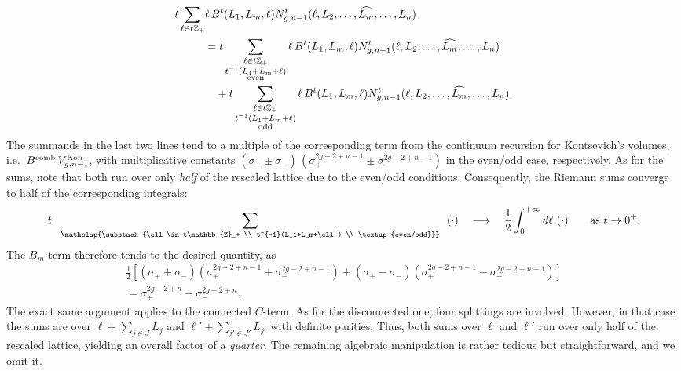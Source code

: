 \documentclass[a4paper,11pt,english]{article}
\theoremstyle{plain}
\theoremstyle{definition}
\theoremstyle{plain}
\newcommand{\Z}{\mathbb{Z}}
\begin{document}
\begin{equation}
\begin{split}
    t
    \sum_{\ell \in t\Z_+} &
        \ell \, B^{t}(L_1,L_m,\ell)
        N_{g,n-1}^{t}(\ell,L_2,\dots, \widehat{L_m},\dots, L_n)
         \\
    &=
    t
    \sum_{\substack{\ell \in t\Z_+ \\ t^{-1}(L_1 + L_m + \ell) \\ \textup{even}}}
        \ell \, B^{t}(L_1,L_m,\ell)
        N_{g,n-1}^{t}(\ell,L_2,\dots, \widehat{L_m},\dots, L_n) \\
    & \quad
    +
    t
    \sum_{\substack{\ell \in t\Z_+ \\ t^{-1}(L_1 + L_m + \ell) \\ \textup{odd}}}
        \ell \, B^{t}(L_1,L_m,\ell)
        N_{g,n-1}^{t}(\ell,L_2,\dots, \widehat{L_m},\dots, L_n) .
\end{split}
\end{equation}
The summands in the last two lines tend to a multiple of the corresponding term from the continuum recursion for Kontsevich's volumes, i.e.\ $B^{\textup{comb}} \, V_{g,n-1}^{\textup{Kon}}$, with multiplicative constants $(\sigma_+ \pm \sigma_-) \,(\sigma_+^{2g-2+n-1} \pm \sigma_-^{2g-2+n-1})$ in the even/odd case, respectively. As for the sums, note that both run over only \emph{half} of the rescaled lattice due to the even/odd conditions. Consequently, the Riemann sums converge to half of the corresponding integrals:
\begin{equation}
    t \ \ \sum_{\mathclap{\substack{\ell \in t\Z_+ \\ t^{-1}(L_1+L_m+\ell) \\ \textup{even/odd}}}} \ \ (\cdot)
    \quad\longrightarrow\quad
    \frac{1}{2}
    \int_{0}^{+\infty}
        d\ell \ (\cdot)
    \qquad
    \text{as } t \to 0^+.
\end{equation}
The $B_m$-term therefore tends to the desired quantity, as
\begin{multline}
    \frac{1}{2}
    \left[
        (\sigma_+ + \sigma_-)
        (\sigma_+^{2g-2+n-1} + \sigma_-^{2g-2+n-1})
        +
        (\sigma_+ - \sigma_-)
        (\sigma_+^{2g-2+n-1} - \sigma_-^{2g-2+n-1})
    \right] \\
    =
    \sigma_+^{2g-2+n} + \sigma_-^{2g-2+n} .
\end{multline}
The exact same argument applies to the connected $C$-term. As for the disconnected one, four splittings are involved. However, in that case the sums are over $\ell + \sum_{j \in J} L_j$ and $\ell' + \sum_{j' \in J'} L_{j'}$ with definite parities. Thus, both sums over $\ell$ and $\ell'$ run over only half of the rescaled lattice, yielding an overall factor of a \emph{quarter}. The remaining algebraic manipulation is rather tedious but straightforward, and we omit it.
\end{document}
